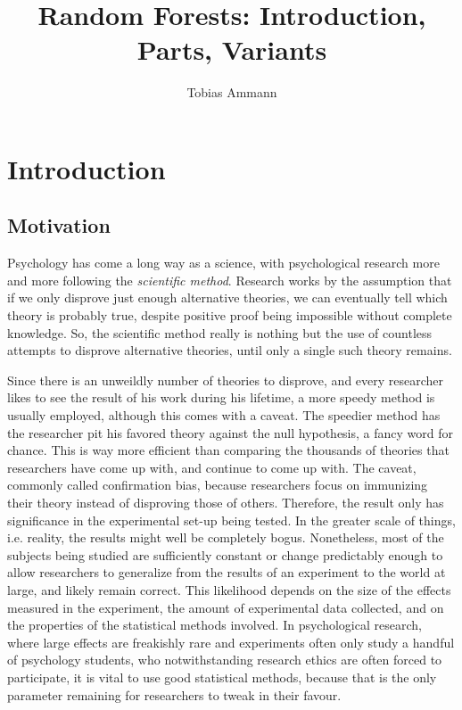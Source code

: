 \documentclass[a4paper,man,12pt,apacite,floatsintext,draftfirst]{apa6} %
\title{Random Forests: Introduction, Parts, Variants}
\author{Tobias Ammann}
\affiliation{Literature Study at the Workgroup for Psychological Methods,\\Evaluation and Statistics, Department of Psychology.\\Supervised by Prof. Dr. Carolin Strobl}
\begin{document}
\maketitle

\tableofcontents

\newpage
\section{Introduction}

\subsection{Motivation}
Psychology has come a long way as a science, with psychological research
more and more following
the \emph{scientific method}.
Research works by the assumption that if we only disprove just enough
alternative theories, we can eventually tell which theory is probably
true, despite positive proof being impossible without complete knowledge.
So, the scientific method really is nothing but the use of countless
attempts to disprove alternative theories, until only a single such theory
remains.

Since there is an unweildly number of theories to disprove, and every
researcher likes to see the result of his work during his lifetime, a
more speedy method is usually employed, although this comes with a caveat.
The speedier method has the researcher pit his favored theory against
the null hypothesis, a fancy word for chance.
This is way more efficient than comparing the thousands of
theories that researchers have come up with, and continue to come up with.
The caveat, commonly called confirmation bias, because researchers focus
on immunizing their theory instead of disproving those of others.
Therefore, the result only has significance in the experimental set-up
being tested.
In the greater scale of things, i.e. reality, the results might well be
completely bogus.
Nonetheless, most of the subjects being studied are sufficiently constant
or change predictably enough to allow researchers to generalize from the
results of an experiment to the world at large, and likely remain correct.
This likelihood depends on the size of the effects measured in the
experiment, the amount of experimental data collected,
and on the properties of the statistical methods involved.
In psychological research, where large effects are freakishly rare and
experiments often only study a handful of psychology students, who
notwithstanding research ethics are often forced to participate, it is
vital to use good statistical methods, because that is the only parameter
remaining for researchers to tweak in their favour.
\end{document}

